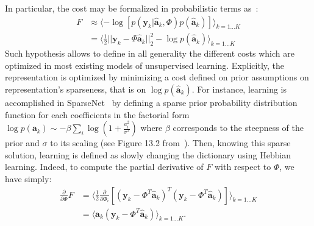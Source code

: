 \documentclass[vision,article,submit,oneauthor,pdftex]{Definitions/mdpi}
\newcommand{\coef}{\mathbf{a}} %
\newcommand{\image}{\mathbf{y}} %
\newcommand{\dico}{\Phi} %
\newcommand{\norm}[1]{|\!| #1 |\!|}
\begin{document}
In particular, the cost %
may be formalized in probabilistic terms as~\citep{Olshausen97}:
\begin{align}
F &\approx \langle - \log [ p(\image_k | \hat{\coef}_{k}, \dico ) p(\hat{\coef}_{k}) ]\rangle_{k = 1 \ldots K} \\
&= \langle \frac{1}{2} \norm{\image_k - \dico \hat{\coef}_{k}}_2^2 - \log p(\hat{\coef}_{k})\rangle_{k = 1 \ldots K} \label{eq:sparse_cost} \end{align}
Such hypothesis allows to define in all generality the different costs which are optimized in most existing models of unsupervised learning. Explicitly, the representation is optimized by minimizing a cost defined on prior assumptions on representation's sparseness, that is on $\log p( \hat{\coef}_{k})$. For instance, learning is accomplished in {\sc SparseNet}~\citep{Olshausen97} by defining a sparse prior probability distribution function for each coefficients in the factorial form $\log p(\coef_{k}) \sim -\beta \sum_i \log ( 1 + \frac{a_i^2}{\sigma^2} )$ where $\beta$ corresponds to the steepness of the prior and $\sigma$ to its scaling (see Figure 13.2 from~\citep{Olshausen02}). Then, knowing this sparse solution, learning is defined as slowly changing the dictionary using Hebbian learning.
Indeed, to compute the partial derivative of $F$ with respect to $\dico$, we have simply:
\begin{align}
\frac{\partial }{\partial \dico } F &= \langle\frac{1}{2} \frac{\partial }{\partial \dico_i }[(\image_k - \dico^T \hat{\coef}_{k})^T (\image_k - \dico^T \hat{\coef}_{k})]\rangle_{k = 1 \ldots K} \\
&= \langle\hat{\coef}_{k} (\image_k - \dico^T \hat{\coef}_{k})\rangle_{k = 1 \ldots K}.
\end{align}
\end{document}
